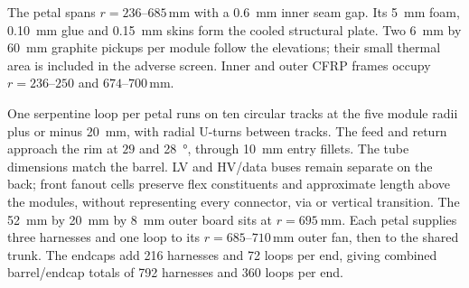 The petal spans $r=236$--$685\,\unit{\milli\metre}$ with a
\qty{0.6}{\milli\metre} inner seam gap. Its \qty{5}{\milli\metre} foam,
\qty{0.10}{\milli\metre} glue and \qty{0.15}{\milli\metre} skins form the
cooled structural plate. Two \qty{6}{\milli\metre} by \qty{60}{\milli\metre}
graphite pickups per module follow the elevations; their small thermal area is
included in the adverse screen. Inner and outer CFRP frames occupy
$r=236$--$250$ and $674$--$700\,\unit{\milli\metre}$.

One serpentine loop per petal runs on ten circular tracks at the five module
radii plus or minus \qty{20}{\milli\metre}, with radial U-turns between tracks.
The feed and return approach the rim at $29$ and \qty{28}{\degree}, through
\qty{10}{\milli\metre} entry fillets. The tube dimensions match the barrel.
LV and HV/data buses remain separate on the back; front fanout cells preserve
flex constituents and approximate length above the modules, without representing
every connector, via or vertical transition. The
\qty{52}{\milli\metre} by \qty{20}{\milli\metre} by \qty{8}{\milli\metre}
outer board sits at $r=\qty{695}{\milli\metre}$. Each petal supplies three
harnesses and one loop to its $r=685$--$710\,\unit{\milli\metre}$ outer fan,
then to the shared trunk. The endcaps add 216 harnesses and 72 loops per end,
giving combined barrel/endcap totals of 792 harnesses and 360 loops per end.
